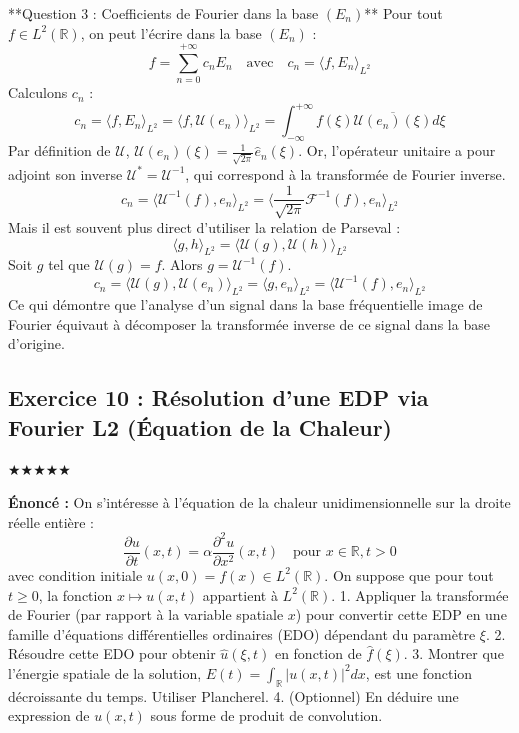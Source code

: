 \documentclass[11pt,a4paper]{article}
\begin{document}
**Question 3 : Coefficients de Fourier dans la base $(E_n)$**
Pour tout $f \in L^2(\mathbb{R})$, on peut l'écrire dans la base $(E_n)$ :
$$ f = \sum_{n=0}^{+\infty} c_n E_n \quad \text{avec} \quad c_n = \langle f, E_n \rangle_{L^2} $$
Calculons $c_n$ :
$$ c_n = \langle f, E_n \rangle_{L^2} = \langle f, \mathcal{U}(e_n) \rangle_{L^2} = \int_{-\infty}^{+\infty} f(\xi) \overline{\mathcal{U}(e_n)(\xi)} d\xi $$
Par définition de $\mathcal{U}$, $\mathcal{U}(e_n)(\xi) = \frac{1}{\sqrt{2\pi}} \hat{e}_n(\xi)$. Or, l'opérateur unitaire a pour adjoint son inverse $\mathcal{U}^* = \mathcal{U}^{-1}$, qui correspond à la transformée de Fourier inverse.
$$ c_n = \langle \mathcal{U}^{-1}(f), e_n \rangle_{L^2} = \langle \frac{1}{\sqrt{2\pi}} \mathcal{F}^{-1}(f), e_n \rangle_{L^2} $$
Mais il est souvent plus direct d'utiliser la relation de Parseval :
$$ \langle g, h \rangle_{L^2} = \langle \mathcal{U}(g), \mathcal{U}(h) \rangle_{L^2} $$
Soit $g$ tel que $\mathcal{U}(g) = f$. Alors $g = \mathcal{U}^{-1}(f)$.
$$ c_n = \langle \mathcal{U}(g), \mathcal{U}(e_n) \rangle_{L^2} = \langle g, e_n \rangle_{L^2} = \langle \mathcal{U}^{-1}(f), e_n \rangle_{L^2} $$
Ce qui démontre que l'analyse d'un signal dans la base fréquentielle image de Fourier équivaut à décomposer la transformée inverse de ce signal dans la base d'origine.


\subsection*{Exercice 10 : Résolution d'une EDP via Fourier L2 (Équation de la Chaleur)}
$\bigstar\bigstar\bigstar\bigstar\bigstar$

\textbf{Énoncé :}
On s'intéresse à l'équation de la chaleur unidimensionnelle sur la droite réelle entière :
$$ \frac{\partial u}{\partial t}(x,t) = \alpha \frac{\partial^2 u}{\partial x^2}(x,t) \quad \text{pour } x \in \mathbb{R}, t > 0 $$
avec condition initiale $u(x,0) = f(x) \in L^2(\mathbb{R})$.
On suppose que pour tout $t \ge 0$, la fonction $x \mapsto u(x,t)$ appartient à $L^2(\mathbb{R})$.
1. Appliquer la transformée de Fourier (par rapport à la variable spatiale $x$) pour convertir cette EDP en une famille d'équations différentielles ordinaires (EDO) dépendant du paramètre $\xi$.
2. Résoudre cette EDO pour obtenir $\hat{u}(\xi, t)$ en fonction de $\hat{f}(\xi)$.
3. Montrer que l'énergie spatiale de la solution, $E(t) = \int_{\mathbb{R}} |u(x,t)|^2 dx$, est une fonction décroissante du temps. Utiliser Plancherel.
4. (Optionnel) En déduire une expression de $u(x,t)$ sous forme de produit de convolution.
\end{document}
